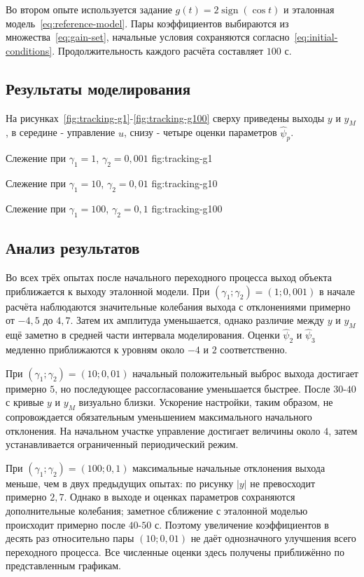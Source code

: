 Во втором опыте используется задание
$g(t)=2\operatorname{sign}(\cos t)$ и эталонная
модель~\eqref{eq:reference-model}.
Пары коэффициентов выбираются из множества~\eqref{eq:gain-set},
начальные условия сохраняются согласно~\eqref{eq:initial-conditions}.
Продолжительность каждого расчёта составляет $100$ с.

\subsection{Результаты моделирования}

На рисунках~\ref{fig:tracking-g1}-\ref{fig:tracking-g100}
сверху приведены выходы $y$ и $y_M$, в середине - управление $u$,
снизу - четыре оценки параметров $\hat\psi_p$.

  {Слежение при $\gamma_1=1$, $\gamma_2=0{,}001$}
  {fig:tracking-g1}

  {Слежение при $\gamma_1=10$, $\gamma_2=0{,}01$}
  {fig:tracking-g10}

  {Слежение при $\gamma_1=100$, $\gamma_2=0{,}1$}
  {fig:tracking-g100}


\subsection{Анализ результатов}

Во всех трёх опытах после начального переходного процесса
выход объекта приближается к выходу эталонной модели.
При $(\gamma_1;\gamma_2)=(1;0{,}001)$ в начале расчёта
наблюдаются значительные колебания выхода с отклонениями
примерно от $-4{,}5$ до $4{,}7$.
Затем их амплитуда уменьшается, однако различие между $y$ и $y_M$
ещё заметно в средней части интервала моделирования.
Оценки $\hat\psi_2$ и $\hat\psi_3$ медленно приближаются
к уровням около $-4$ и $2$ соответственно.

При $(\gamma_1;\gamma_2)=(10;0{,}01)$
начальный положительный выброс выхода достигает примерно $5$,
но последующее рассогласование уменьшается быстрее.
После $30$-$40$ с кривые $y$ и $y_M$ визуально близки.
Ускорение настройки, таким образом, не сопровождается
обязательным уменьшением максимального начального отклонения.
На начальном участке управление достигает величины около $4$,
затем устанавливается ограниченный периодический режим.

При $(\gamma_1;\gamma_2)=(100;0{,}1)$
максимальные начальные отклонения выхода меньше, чем в двух
предыдущих опытах: по рисунку $|y|$ не превосходит примерно $2{,}7$.
Однако в выходе и оценках параметров сохраняются дополнительные
колебания; заметное сближение с эталонной моделью происходит
примерно после $40$-$50$ с.
Поэтому увеличение коэффициентов в десять раз относительно
пары $(10;0{,}01)$ не даёт однозначного улучшения всего
переходного процесса. Все численные оценки здесь получены
приближённо по представленным графикам.

